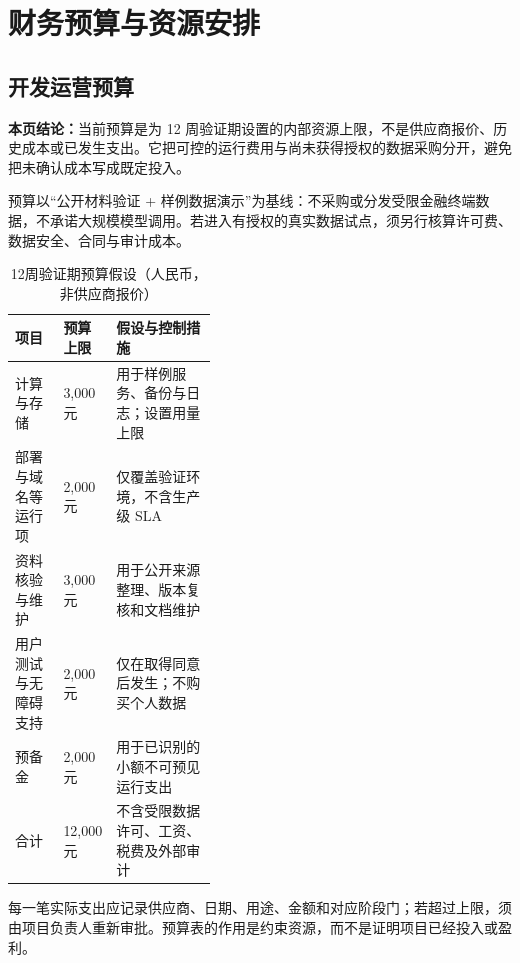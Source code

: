 \clearpage
\section{财务预算与资源安排}
\subsection*{开发运营预算}\label{page:44}
\fi

\textbf{本页结论：}当前预算是为 12 周验证期设置的内部资源上限，不是供应商报价、历史成本或已发生支出。它把可控的运行费用与尚未获得授权的数据采购分开，避免把未确认成本写成既定投入。

预算以“公开材料验证 + 样例数据演示”为基线：不采购或分发受限金融终端数据，不承诺大规模模型调用。若进入有授权的真实数据试点，须另行核算许可费、数据安全、合同与审计成本。

\begin{table}[htbp]
\centering
\caption{12周验证期预算假设（人民币，非供应商报价）}
\label{tab:wty-budget}
\small
\begin{tabularx}{\linewidth}{p{0.24\linewidth}p{0.16\linewidth}X}
\toprule
项目 & 预算上限 & 假设与控制措施 \\
\midrule
计算与存储 & 3,000 元 & 用于样例服务、备份与日志；设置用量上限 \\
部署与域名等运行项 & 2,000 元 & 仅覆盖验证环境，不含生产级 SLA \\
资料核验与维护 & 3,000 元 & 用于公开来源整理、版本复核和文档维护 \\
用户测试与无障碍支持 & 2,000 元 & 仅在取得同意后发生；不购买个人数据 \\
预备金 & 2,000 元 & 用于已识别的小额不可预见运行支出 \\
\midrule
合计 & 12,000 元 & 不含受限数据许可、工资、税费及外部审计 \\
\bottomrule
\end{tabularx}
\end{table}

每一笔实际支出应记录供应商、日期、用途、金额和对应阶段门；若超过上限，须由项目负责人重新审批。预算表的作用是约束资源，而不是证明项目已经投入或盈利。
